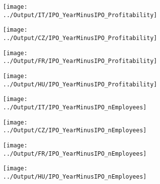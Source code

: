 \documentclass[12pt,notitlepage]{article}
\begin{document}
\begin{figure}[!htpb]
\centering
\caption{IPO and Profitability}
\begin{subfigure}{.49\textwidth}
    \centering
 \texttt{[image: ../Output/IT/IPO\_YearMinusIPO\_Profitability]}
\end{subfigure}%
\begin{subfigure}{.49\textwidth}
    \centering
 \texttt{[image: ../Output/CZ/IPO\_YearMinusIPO\_Profitability]}
\end{subfigure}
\begin{subfigure}{.49\textwidth}
    \centering
 \texttt{[image: ../Output/FR/IPO\_YearMinusIPO\_Profitability]}
\end{subfigure}%
\begin{subfigure}{.49\textwidth}
    \centering
 \texttt{[image: ../Output/HU/IPO\_YearMinusIPO\_Profitability]}
\end{subfigure}
\end{figure}
\pagebreak

\begin{figure}[!htpb]
\centering
\caption{IPO and Number of Employees}
\begin{subfigure}{.49\textwidth}
    \centering
 \texttt{[image: ../Output/IT/IPO\_YearMinusIPO\_nEmployees]}
\end{subfigure}%
\begin{subfigure}{.49\textwidth}
    \centering
 \texttt{[image: ../Output/CZ/IPO\_YearMinusIPO\_nEmployees]}
\end{subfigure}
\begin{subfigure}{.49\textwidth}
    \centering
 \texttt{[image: ../Output/FR/IPO\_YearMinusIPO\_nEmployees]}
\end{subfigure}%
\begin{subfigure}{.49\textwidth}
    \centering
 \texttt{[image: ../Output/HU/IPO\_YearMinusIPO\_nEmployees]}
\end{subfigure}
\end{figure}
\pagebreak
\end{document}
